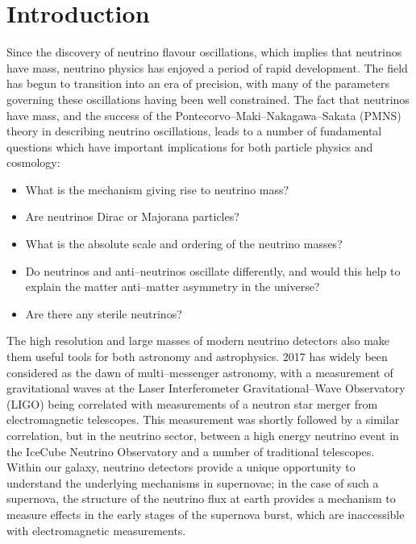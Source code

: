 \chapter{\label{ch:intro}Introduction} 

\minitoc

Since the discovery of neutrino flavour oscillations, which implies that
neutrinos have mass, neutrino physics has enjoyed a period of rapid development.
The field has begun to transition into an era of precision, with many of the
parameters governing these oscillations having been well constrained. The fact
that neutrinos have mass, and the success of the
Pontecorvo--Maki--Nakagawa--Sakata (PMNS) theory in describing neutrino 
oscillations, leads to a number of fundamental questions which have important 
implications for both particle physics and cosmology: 
\begin{itemize}
	\item What is the mechanism giving rise to neutrino mass? 
	\item Are neutrinos Dirac or Majorana particles?
	\item What is the absolute scale and ordering of the neutrino masses?
	\item Do neutrinos and anti--neutrinos oscillate differently, and would this 
	      help to explain the matter anti--matter asymmetry in the universe?
	\item Are there any sterile neutrinos?
\end{itemize}

The high resolution and large masses of modern neutrino detectors also
make them useful tools for both astronomy and astrophysics. 2017 has widely 
been considered as the dawn of multi--messenger astronomy, with a measurement 
of gravitational waves at the Laser Interferometer Gravitational--Wave 
Observatory (LIGO) being correlated with measurements of a neutron star merger 
from electromagnetic telescopes\cite{Abbott2017}. This measurement was 
shortly followed by a similar correlation, but in the neutrino sector, between a
high energy neutrino event in the IceCube Neutrino Observatory and a number of 
traditional telescopes\cite{Aartsen2018}. Within our galaxy, neutrino 
detectors provide a unique opportunity to understand the underlying mechanisms 
in supernovae; in the case of such a supernova, the structure of the neutrino 
flux at earth provides a mechanism to measure effects in the early stages of 
the supernova burst, which are inaccessible with electromagnetic 
measurements\cite{Scholberg:2012id}.

